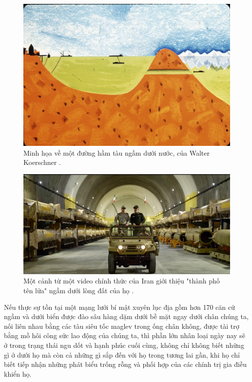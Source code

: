 \documentclass[10pt,twocolumn,letterpaper]{article}
\begin{document}
\begin{figure}[t]
\begin{center}
   \includegraphics[width=1\linewidth]{sub.jpg}
\end{center}
   \caption{Minh họa về một đường hầm tàu ngầm dưới nước, của Walter Koerschner \cite{22,23}.}
\label{fig:6}
\label{fig:onecol}

\end{figure}

\begin{figure}[t]
\begin{center}
   \includegraphics[width=1\linewidth]{iran.jpeg}
\end{center}
   \caption{Một cảnh từ một video chính thức của Iran giới thiệu "thành phố tên lửa" ngầm dưới lòng đất của họ \cite{39,40}.}
\label{fig:12}
\label{fig:onecol}
\end{figure}

Nếu thực sự tồn tại một mạng lưới bí mật xuyên lục địa gồm hơn 170 căn cứ ngầm và dưới biển được đào sâu hàng dặm dưới bề mặt ngay dưới chân chúng ta, nối liên nhau bằng các tàu siêu tốc maglev trong ống chân không, được tài trợ bằng mồ hôi công sức lao động của chúng ta, thì phần lớn nhân loại ngày nay sẽ ở trong trạng thái ngu dốt và hạnh phúc cuối cùng, không chỉ không biết những gì ở dưới họ mà còn cả những gì sắp đến với họ trong tương lai gần, khi họ chỉ biết tiếp nhận những phát biểu trống rỗng và phối hợp của các chính trị gia điều khiển họ.
\end{document}
